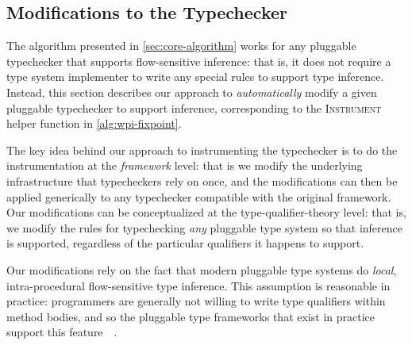 \subsection{Modifications to the Typechecker}
\label{sec:instrument}

The algorithm presented in \cref{sec:core-algorithm} works for
any pluggable typechecker that supports flow-sensitive inference:
that is, it does not require a type system implementer to write
any special rules to support type inference. Instead, this section
describes our approach to \emph{automatically} modify a given
pluggable typechecker to support inference, corresponding to the
\textsc{Instrument} helper function in \cref{alg:wpi-fixpoint}.

The key idea behind our approach to instrumenting the typechecker
is to do the instrumentation at the \emph{framework} level: that is
we modify the underlying infrastructure that typecheckers rely on
once, and the modifications can then be applied generically to any
typechecker compatible with the original framework. Our modifications
can be conceptualized at the type-qualifier-theory level: that is,
we modify the rules for typechecking \emph{any} pluggable type system
so that inference is supported,
regardless of the particular qualifiers it happens to support.

Our modifications rely on the fact that modern pluggable type systems
do \emph{local}, intra-procedural flow-sensitive type inference. This assumption is
reasonable in practice: programmers are generally not willing to
write type qualifiers within method bodies, and so 
the pluggable type frameworks that exist in practice 
support this feature~\cite{PapiACPE2008}~.  


